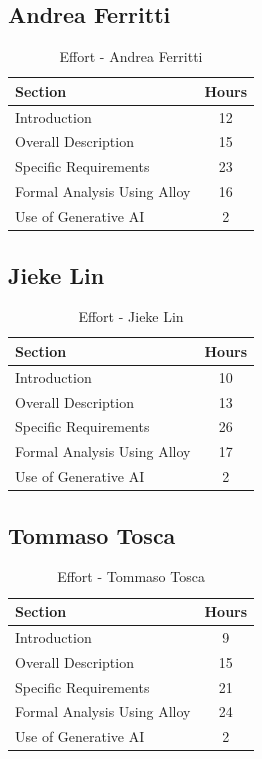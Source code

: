 \subsection*{Andrea Ferritti}

\begin{table}[H]
    \centering
\begin{tabular}{|l|c|}
        \hline
        \textbf{Section} & \textbf{Hours} \\ \hline
        Introduction & 12 \\ \hline
        Overall Description & 15\\ \hline
        Specific Requirements & 23\\ \hline
        Formal Analysis Using Alloy & 16 \\ \hline
        Use of Generative AI & 2 \\ \hline
    \end{tabular}
    \caption{Effort - Andrea Ferritti}
    \label{tab:effortferritti}
\end{table}

\subsection*{Jieke Lin}

\begin{table}[H]
    \centering
\begin{tabular}{|l|c|}
        \hline
        \textbf{Section} & \textbf{Hours} \\ \hline
        Introduction & 10 \\ \hline
        Overall Description & 13 \\ \hline
        Specific Requirements & 26\\ \hline
        Formal Analysis Using Alloy & 17 \\ \hline
        Use of Generative AI & 2 \\ \hline
    \end{tabular}
    \caption{Effort - Jieke Lin}
    \label{tab:effortlin}
\end{table}

\subsection*{Tommaso Tosca}

\begin{table}[H]
    \centering
\begin{tabular}{|l|c|}
        \hline
        \textbf{Section} & \textbf{Hours} \\ \hline
        Introduction & 9 \\ \hline
        Overall Description & 15\\ \hline
        Specific Requirements & 21\\ \hline
        Formal Analysis Using Alloy & 24 \\ \hline
        Use of Generative AI & 2 \\ \hline
    \end{tabular}
    \caption{Effort - Tommaso Tosca}
    \label{tab:efforttosca}
\end{table}